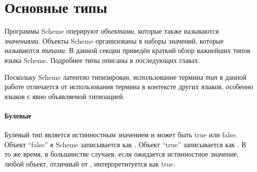 \section{Основные типы}\vspace{1mm}

Программы Scheme оперируют \textit{объектами}, которые также называются
\textit{значениями}. Объекты Scheme организованы в наборы значений, которые называются
\textit{типами}. В данной секции приведён краткий обзор важнейших типов языка Scheme. Подробнее
типы описаны в последующих главах.\vspace{1mm}

\begin{note}
  Поскольку Scheme латентно типизирован, использование термина \textit{тип} в данной работе
  отличается от использования термина в контексте других языков, особенно языков с явно
  объявляемой типизацией.
\end{note}

\paragraph{Булевые}\vspace{1mm}

Булевый тип является истинностным значением и может быть true или
false. Объект ``false'' в Scheme записывается как \textbf{\schfalse{}}.  Объект ``true''
записывается как \textbf{\schtrue{}}. В то же время, в большинстве случаев, если ожидается
истинностное значение, любой объект, отличный от \textbf{\schfalse{}}, интерпретитуется как
true.\vspace{1mm}

